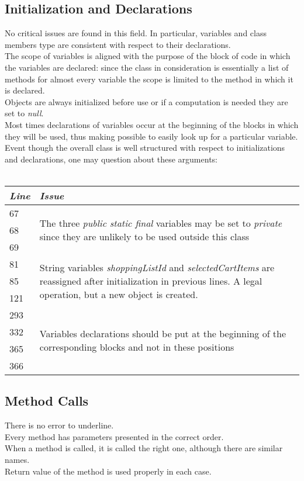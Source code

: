 \documentclass[11pt,a4paper]{report}
\begin{document}
\subsection{Initialization and Declarations}
No critical issues are found in this field. In particular, variables and class members type are consistent with respect to their declarations.\\The scope of variables is aligned with the purpose of the block of code in which the variables are declared: since the class in consideration is essentially a list of methods for almost every variable the scope is limited to the method in which it is declared.\\Objects are always initialized before use or if a computation is needed they are set to \textit{null}.\\Most times declarations of variables occur at the beginning of the blocks in which they will be used, thus making possible to easily look up for a particular variable.\\
Event though the overall class is well structured with respect to initializations and declarations, one may question about these arguments:
\\\\
\begin{tabularx}{\textwidth}{|l|X|}
	\hline
	\textit{Line} & \textit{Issue}\\
	\hline
	67 & \multirow{3}{\linewidth}{The three \textit{public static final} variables may be set to \textit{private} since they are unlikely to be used outside this class}\\
	68 & \\
	69 & \\
	\hline
	\hline
	81 & \multirow{3}{\linewidth}{String variables \textit{shoppingListId} and \textit{selectedCartItems} are reassigned after initialization in previous lines. A legal operation, but a new object is created.}\\
	85 & \\
	121 & \\
	\hline
	\hline
	293 & \multirow{4}{\linewidth}{Variables declarations should be put at the beginning of the corresponding blocks and not in these positions}\\
	332 & \\
	365 & \\
	366 & \\
	\hline
\end{tabularx}
\subsection{Method Calls}
There is no error to underline.\\Every method has parameters presented in the correct order.\\When a method is called, it is called the right one, although there are similar names.\\Return value of the method is used properly in each case. 
\end{document}
